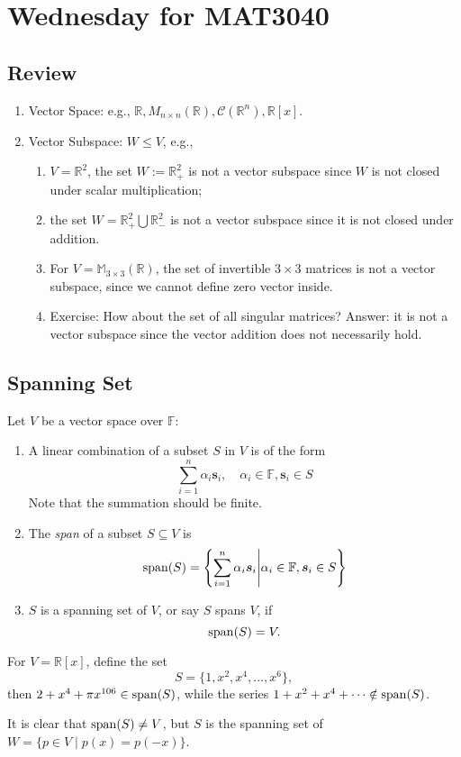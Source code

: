 
\section{Wednesday for MAT3040}
\subsection{Review}
\begin{enumerate}
\item
Vector Space: e.g., $\mathbb{R},M_{n\times n}(\mathbb{R}),\mathcal{C}(\mathbb{R}^n),\mathbb{R}[x]$.
\item
Vector Subspace: $W\le V$, e.g., 
\begin{enumerate}
\item
$V=\mathbb{R}^2$, the set $W:=\mathbb{R}^2_+$ is not a vector subspace since $W$ is not closed under scalar multiplication;
\item
the set $W=\mathbb{R}^2_+\bigcup\mathbb{R}^2_-$ is not a vector subspace since it is not closed under addition.
\item
For $V=\mathbb{M}_{3\times 3}(\mathbb{R})$, the set of invertible $3\times 3$ matrices is not a vector subspace, since we cannot define zero vector inside.
\item
Exercise: How about the set of all singular matrices? Answer: it is not a vector subspace since the vector addition does not necessarily hold.
\end{enumerate} 

\end{enumerate}
\subsection{Spanning Set}
\begin{definition}[Span]
Let $V$ be a vector space over $\mathbb{F}$:
\begin{enumerate}
\item
A linear combination of a subset $S$ in $V$ is of the form
\[
\sum_{i=1}^n\alpha_i\bm s_i,\quad
\alpha_i\in\mathbb{F},
\bm s_i\in S
\]
Note that the summation should be finite.
\item
The \emph{span} of a subset $S\subseteq V$ is
\[
\operatorname{span}(S)=\left\{\sum_{i=1}^n\alpha_i\bm s_i\middle|\alpha_i\in\mathbb{F},
\bm s_i\in S\right\}
\] 
\item
$S$ is a spanning set of $V$, or say $S$ spans $V$, if
\[
\operatorname{span}(S)=V.
\]
\end{enumerate}
\end{definition}
\begin{example}
For $V=\mathbb{R}[x]$, define the set
\[
S=\{1,x^2,x^4,\dots,x^6\},
\]
then $2+x^4+\pi x^{106}\in\operatorname{span}(S)$, while the series $1+x^2+x^4+\cdots\notin\operatorname{span}(S)$.

It is clear that $\operatorname{span}(S)\ne V$, but $S$ is the spanning set of $W=\{p\in V\mid p(x)=p(-x)\}$.
\end{example}

